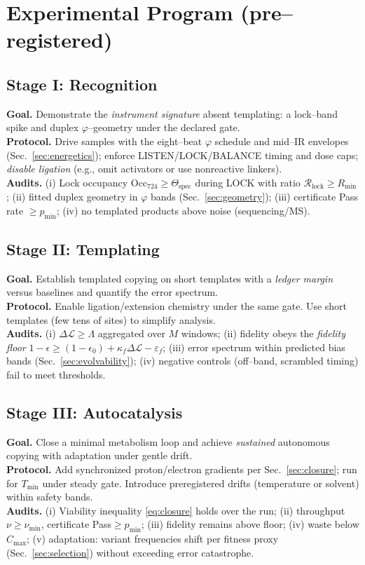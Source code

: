 \documentclass[11pt]{article}
\begin{document}
\section{Experimental Program (pre--registered)}\label{sec:program}

\subsection{Stage I: Recognition}\label{sec:stage1}
\textbf{Goal.} Demonstrate the \emph{instrument signature} absent templating: a lock--band spike and duplex $\varphi$--geometry under the declared gate.\\
\textbf{Protocol.} Drive samples with the eight--beat $\varphi$ schedule and mid--IR envelopes (Sec.~\ref{sec:energetics}); enforce \textsf{LISTEN/LOCK/BALANCE} timing and dose caps; \emph{disable ligation} (e.g., omit activators or use nonreactive linkers).\\
\textbf{Audits.} (i) Lock occupancy $\mathrm{Occ}_{724}\ge \Theta_{\mathrm{spec}}$ during \textsf{LOCK} with ratio $\mathcal{R}_{\mathrm{lock}}\ge R_{\min}$; (ii) fitted duplex geometry in $\varphi$ bands (Sec.~\ref{sec:geometry}); (iii) certificate \textsf{Pass} rate $\ge p_{\min}$; (iv) no templated products above noise (sequencing/MS).

\subsection{Stage II: Templating}\label{sec:stage2}
\textbf{Goal.} Establish templated copying on short templates with a \emph{ledger margin} versus baselines and quantify the error spectrum.\\
\textbf{Protocol.} Enable ligation/extension chemistry under the same gate. Use short templates (few tens of sites) to simplify analysis.\\
\textbf{Audits.} (i) $\Delta\mathcal{L}\ge \Lambda$ aggregated over $M$ windows; (ii) fidelity obeys the \emph{fidelity floor} $1-\epsilon\ge(1-\epsilon_0)+\kappa_f\Delta\mathcal{L}-\varepsilon_f$; (iii) error spectrum within predicted bias bands (Sec.~\ref{sec:evolvability}); (iv) negative controls (off--band, scrambled timing) fail to meet thresholds.

\subsection{Stage III: Autocatalysis}\label{sec:stage3}
\textbf{Goal.} Close a minimal metabolism loop and achieve \emph{sustained} autonomous copying with adaptation under gentle drift.\\
\textbf{Protocol.} Add synchronized proton/electron gradients per Sec.~\ref{sec:closure}; run for $T_{\min}$ under steady gate. Introduce preregistered drifts (temperature or solvent) within safety bands.\\
\textbf{Audits.} (i) Viability inequality \eqref{eq:closure} holds over the run; (ii) throughput $\nu\ge \nu_{\min}$, certificate \textsf{Pass}$\ge p_{\min}$; (iii) fidelity remains above floor; (iv) waste below $C_{\max}$; (v) adaptation: variant frequencies shift per fitness proxy (Sec.~\ref{sec:selection}) without exceeding error catastrophe.
\end{document}
